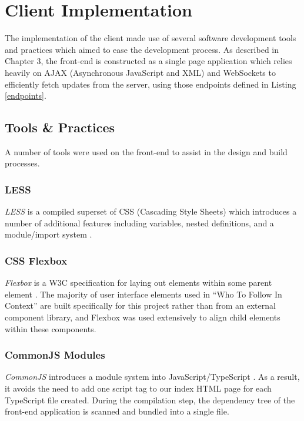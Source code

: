 \documentclass{l4proj}
\begin{document}
                          
\section{Client Implementation}
The implementation of the client made use of several software development tools and practices which aimed to ease the development process. As described in Chapter 3, the front-end is constructed as a single page application which relies heavily on AJAX (Asynchronous JavaScript and XML) and WebSockets to efficiently fetch updates from the server, using those endpoints defined in Listing \ref{endpoints}.

        \subsection{Tools \& Practices}
        A number of tools were used on the front-end to assist in the design and build processes.
           
        \subsubsection{LESS}
        \textit{LESS} is a compiled superset of CSS (Cascading Style Sheets) which introduces a number of additional features including variables, nested definitions, and a module/import system \cite{less}.
        
        \subsubsection{CSS Flexbox}
        \textit{Flexbox} is a W3C specification for laying out elements within some parent element \cite{flexbox}. The majority of user interface elements used in ``Who To Follow In Context'' are built specifically for this project rather than from an external component library, and Flexbox was used extensively to align child elements within these components.

        \subsubsection{CommonJS Modules}
        \textit{CommonJS} introduces a module system into JavaScript/TypeScript \cite{commonjs}. As a result, it avoids the need to add one script tag to our index HTML page for each TypeScript file created. During the compilation step, the dependency tree of the front-end application is scanned and bundled into a single file.
\end{document}
